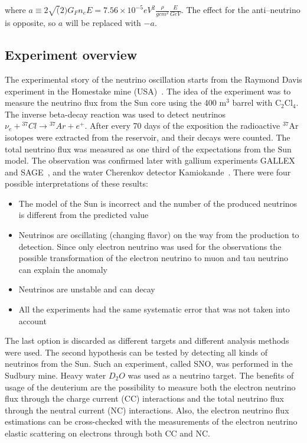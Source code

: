 \documentclass[../main.tex]{subfiles}
\begin{document}
where $a\equiv2\sqrt(2)G_Fn_eE=7.56\times10^{-5}eV^2\frac{\rho}{gcm^2}\frac{E}{GeV}$. The effect for the anti--neutrino is opposite, so $a$ will be replaced with $-a$.

\subsection{Experiment overview}
\label{sec:intro:osc_exp}
The experimental story of the neutrino oscillation starts from the Raymond Davis experiment in the Homestake mine (USA)~\cite{Davis1968}. The idea of the experiment was to measure the neutrino flux from the Sun core using the 400 $\text{m}^3$ barrel with ${\text{C}_2\text{Cl}_4}$. The inverse beta-decay reaction was used to detect neutrinos $\nu_e+{}^{37}Cl\to{}^{37}Ar+e^+$. After every 70 days of the exposition the radioactive ${}^{37}\text{Ar}$ isotopes were extracted from the reservoir, and their decays were counted. The total neutrino flux was measured as one third of the expectations from the Sun model. The observation was confirmed later with gallium experiments GALLEX~\cite{Kirsten1999} and SAGE~\cite{Abdurashitov1999}, and the water Cherenkov detector Kamiokande~\cite{Oyama1989}. There were four possible interpretations of these results:
\begin{itemize}
  \item The model of the Sun is incorrect and the number of the produced neutrinos is different from the predicted value
  \item Neutrinos are oscillating (changing flavor) on the way from the production to detection. Since only electron neutrino was used for the observations the possible transformation of the electron neutrino to muon and tau neutrino can explain the anomaly
  \item Neutrinos are unstable and can decay
  \item All the experiments had the same systematic error that was not taken into account
\end{itemize}
The last option is discarded as different targets and different analysis methods were used. The second hypothesis can be tested by detecting all kinds of neutrinos from the Sun. Such an experiment, called SNO, was performed in the Sudbury mine. Heavy water $D_2O$ was used as a neutrino target. The benefits of usage of the deuterium are the possibility to measure both the electron neutrino flux through the charge current (CC) interactions and the total neutrino flux through the neutral current (NC) interactions. Also, the electron neutrino flux estimations can be cross-checked with the measurements of the electron neutrino elastic scattering on electrons through both CC and NC.
\end{document}
